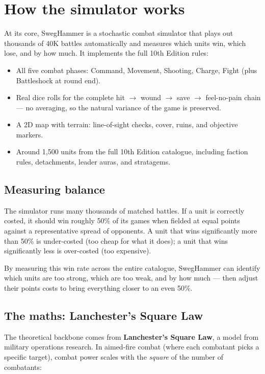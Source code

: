 \documentclass[11pt,a4paper]{article}
\begin{document}
\section{How the simulator works}

At its core, SwegHammer is a stochastic combat simulator that plays out
thousands of 40K battles automatically and measures which units win, which
lose, and by how much. It implements the full 10th Edition rules:

\begin{itemize}[nosep]
  \item All five combat phases: Command, Movement, Shooting, Charge, Fight
        (plus Battleshock at round end).
  \item Real dice rolls for the complete hit $\to$ wound $\to$ save $\to$
        feel-no-pain chain --- no averaging, so the natural variance of the
        game is preserved.
  \item A 2D map with terrain: line-of-sight checks, cover, ruins, and
        objective markers.
  \item Around 1,500 units from the full 10th Edition catalogue, including
        faction rules, detachments, leader auras, and stratagems.
\end{itemize}

\subsection{Measuring balance}

The simulator runs many thousands of matched battles. If a unit is
correctly costed, it should win roughly 50\% of its games when fielded at
equal points against a representative spread of opponents. A unit that wins
significantly more than 50\% is under-costed (too cheap for what it does); a
unit that wins significantly less is over-costed (too expensive).

By measuring this win rate across the entire catalogue, SwegHammer can
identify which units are too strong, which are too weak, and by how much ---
then adjust their points costs to bring everything closer to an even 50\%.

\subsection{The maths: Lanchester's Square Law}

The theoretical backbone comes from \textbf{Lanchester's Square Law}, a
model from military operations research. In aimed-fire combat (where each
combatant picks a specific target), combat power scales with the
\textit{square} of the number of combatants:
\end{document}
